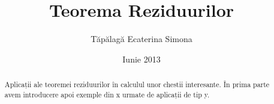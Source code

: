 \documentclass[10pt,a4paper]{article}
\begin{document}
\title{Teorema Reziduurilor}
\author{Tăpălagă Ecaterina Simona}
\date{Iunie 2013}
\maketitle

\begin{abstract}
	Aplicații ale teoremei reziduurilor în calculul unor chestii interesante. În prima parte avem introducere apoi exemple din x urmate de aplicații de tip y.
\end{abstract}

\tableofcontents

\clearpage





\end{document}
